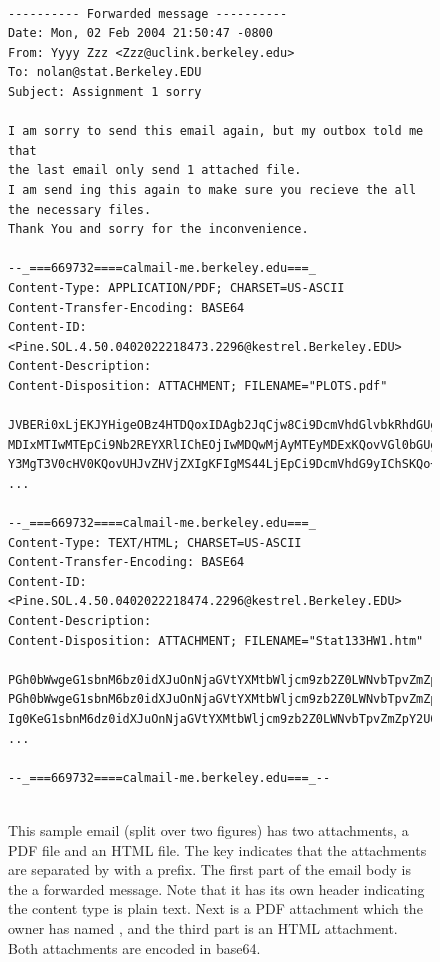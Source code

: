\begin{figure}
{\footnotesize{
\begin{verbatim}

---------- Forwarded message ----------
Date: Mon, 02 Feb 2004 21:50:47 -0800
From: Yyyy Zzz <Zzz@uclink.berkeley.edu>
To: nolan@stat.Berkeley.EDU
Subject: Assignment 1 sorry
 
I am sorry to send this email again, but my outbox told me that 
the last email only send 1 attached file. 
I am send ing this again to make sure you recieve the all 
the necessary files.
Thank You and sorry for the inconvenience.
  
--_===669732====calmail-me.berkeley.edu===_
Content-Type: APPLICATION/PDF; CHARSET=US-ASCII
Content-Transfer-Encoding: BASE64
Content-ID: <Pine.SOL.4.50.0402022218473.2296@kestrel.Berkeley.EDU>
Content-Description:
Content-Disposition: ATTACHMENT; FILENAME="PLOTS.pdf"
 
JVBERi0xLjEKJYHigeOBz4HTDQoxIDAgb2JqCjw8Ci9DcmVhdGlvbkRhdGUgKEQ6MjAwNDAy
MDIxMTIwMTEpCi9Nb2REYXRlIChEOjIwMDQwMjAyMTEyMDExKQovVGl0bGUgKFIgR3JhcGhp
Y3MgT3V0cHV0KQovUHJvZHVjZXIgKFIgMS44LjEpCi9DcmVhdG9yIChSKQo+PgplbmRvYmoK
...
 
--_===669732====calmail-me.berkeley.edu===_
Content-Type: TEXT/HTML; CHARSET=US-ASCII
Content-Transfer-Encoding: BASE64
Content-ID: <Pine.SOL.4.50.0402022218474.2296@kestrel.Berkeley.EDU>
Content-Description:
Content-Disposition: ATTACHMENT; FILENAME="Stat133HW1.htm"
  
PGh0bWwgeG1sbnM6bz0idXJuOnNjaGVtYXMtbWljcm9zb2Z0LWNvbTpvZmZpY2U6b2ZmaWNl^M
PGh0bWwgeG1sbnM6bz0idXJuOnNjaGVtYXMtbWljcm9zb2Z0LWNvbTpvZmZpY2U6b2ZmaWNl^M
Ig0KeG1sbnM6dz0idXJuOnNjaGVtYXMtbWljcm9zb2Z0LWNvbTpvZmZpY2U6d29yZCINCnht^M
...

--_===669732====calmail-me.berkeley.edu===_--
    
\end{verbatim}
}}
\caption{This sample email (split over two figures) has two
  attachments, a PDF file and an HTML file.  The 
  key indicates that the attachments are separated by
   with a
  \Email{--} prefix.  The first part of the email body is the a
  forwarded message.  Note that it has its own header indicating the
  content type is plain text.  Next is a PDF attachment which the
  owner has named , and the third part is an HTML
  attachment.  Both attachments are encoded in base64.  }
\end{figure}

